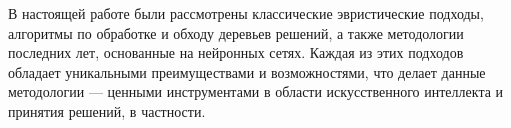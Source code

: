 В настоящей работе были рассмотрены классические эвристические подходы, алгоритмы по обработке и обходу деревьев решений, а также методологии последних лет, основанные на нейронных сетях. Каждая из этих подходов обладает уникальными преимуществами и возможностями, что делает данные методологии --- ценными инструментами в области искусственного интеллекта и принятия решений, в частности.
